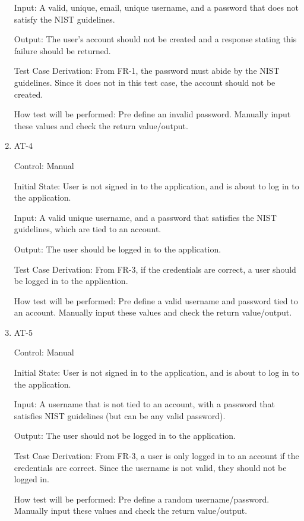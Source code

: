\documentclass[12pt, titlepage]{article}
\begin{document}
\begin{enumerate}
Input: A valid, unique, email, unique username, and a password that does not satisfy the NIST guidelines.
					
Output: The user's account should not be created and a response stating this failure should be returned.

Test Case Derivation: From FR-1, the password must abide by the NIST guidelines. Since it does not in this test case, the account should not 
be created.

How test will be performed: Pre define an invalid password. Manually input these values and check the return value/output.


\item{AT-4\\}

Control: Manual
					
Initial State: User is not signed in to the application, and is about to log in to the application.
					
Input: A valid unique username, and a password that satisfies the NIST guidelines, which are tied to an account.
					
Output: The user should be logged in to the application.

Test Case Derivation: From FR-3, if the credentials are correct, a user should be logged in to the application.

How test will be performed: Pre define a valid username and password tied to an account. Manually input these values and check the return value/output.


\item{AT-5\\}

Control: Manual
					
Initial State: User is not signed in to the application, and is about to log in to the application.
					
Input: A username that is not tied to an account, with a password that satisfies NIST guidelines (but can be any valid password).
					
Output: The user should not be logged in to the application.

Test Case Derivation: From FR-3, a user is only logged in to an account if the credentials are correct. Since the username is not valid,
they should not be logged in.

How test will be performed: Pre define a random username/password. Manually input these values and check the return value/output.


\end{enumerate}
\end{document}
